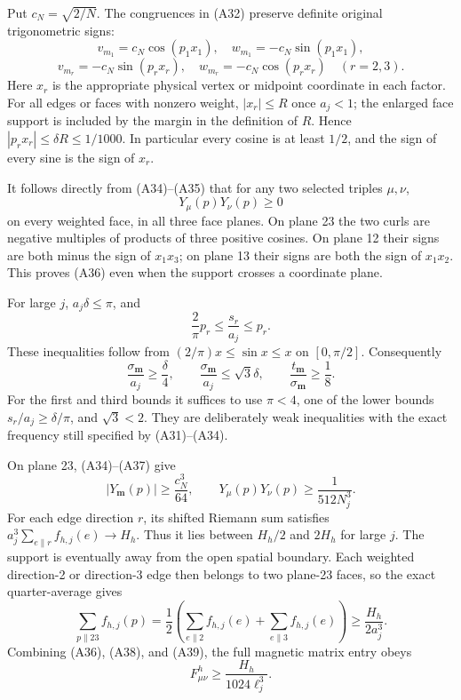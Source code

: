 \documentclass[
  11pt,
]{article}
\begin{document}
Put \(c_N=\sqrt{2/N}\). The congruences in (A32) preserve definite
original trigonometric signs: \[
 v_{m_1}=c_N\cos(p_1x_1),\quad w_{m_1}=-c_N\sin(p_1x_1),
\] \[
 v_{m_r}=-c_N\sin(p_rx_r),\quad w_{m_r}=-c_N\cos(p_rx_r)
 \quad(r=2,3).
\tag{A35}
\] Here \(x_r\) is the appropriate physical vertex or midpoint
coordinate in each factor. For all edges or faces with nonzero weight,
\(|x_r|\le R\) once \(a_j<1\); the enlarged face support is included by
the margin in the definition of \(R\). Hence
\(|p_rx_r|\le\delta R\le1/1000\). In particular every cosine is at least
\(1/2\), and the sign of every sine is the sign of \(x_r\).

It follows directly from (A34)--(A35) that for any two selected triples
\(\mu,\nu\), \[
 Y_\mu(p)Y_\nu(p)\ge0
\tag{A36}
\] on every weighted face, in all three face planes. On plane 23 the two
curls are negative multiples of products of three positive cosines. On
plane 12 their signs are both minus the sign of \(x_1x_3\); on plane 13
their signs are both the sign of \(x_1x_2\). This proves (A36) even when
the support crosses a coordinate plane.

For large \(j\), \(a_j\delta\le\pi\), and \[
 \frac{2}{\pi}p_r\le\frac{s_r}{a_j}\le p_r.
\] These inequalities follow from \((2/\pi)x\le\sin x\le x\) on
\([0,\pi/2]\). Consequently \[
 \frac{\sigma_{\mathbf m}}{a_j}\ge\frac\delta4,
 \qquad \frac{\sigma_{\mathbf m}}{a_j}\le\sqrt3\delta,
 \qquad \frac{t_{\mathbf m}}{\sigma_{\mathbf m}}\ge\frac18.
\tag{A37}
\] For the first and third bounds it suffices to use \(\pi<4\), one of
the lower bounds \(s_r/a_j\ge\delta/\pi\), and \(\sqrt3<2\). They are
deliberately weak inequalities with the exact frequency still specified
by (A31)--(A34).

On plane 23, (A34)--(A37) give \[
 |Y_{\mathbf m}(p)|\ge\frac{c_N^3}{64},\qquad
 Y_\mu(p)Y_\nu(p)\ge\frac1{512N_j^3}.
\tag{A38}
\] For each edge direction \(r\), its shifted Riemann sum satisfies
\(a_j^3\sum_{e\parallel r}f_{h,j}(e)\to H_h\). Thus it lies between
\(H_h/2\) and \(2H_h\) for large \(j\). The support is eventually away
from the open spatial boundary. Each weighted direction-2 or direction-3
edge then belongs to two plane-23 faces, so the exact quarter-average
gives \[
 \sum_{p\parallel23}f_{h,j}(p)
 =\frac12\left(\sum_{e\parallel2}f_{h,j}(e)
                   +\sum_{e\parallel3}f_{h,j}(e)\right)
 \ge\frac{H_h}{2a_j^3}.
\tag{A39}
\] Combining (A36), (A38), and (A39), the full magnetic matrix entry
obeys \[
 F^h_{\mu\nu}\ge\frac{H_h}{1024\ell_j^3}.
\tag{A40}
\]
\end{document}
